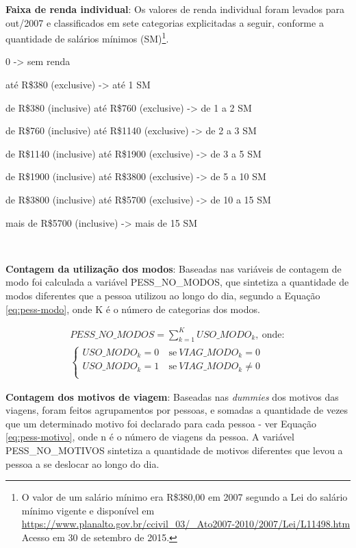 \begin{compactitem}
\item \textbf{Faixa de renda individual}: Os valores de renda individual foram levados para out/2007 e classificados em sete categorias explicitadas a seguir, conforme a quantidade de salários mínimos (SM)\footnote{O valor de um salário mínimo era R\$380,00 em 2007 segundo a Lei do salário mínimo vigente e disponível em \url{ https://www.planalto.gov.br/ccivil_03/_Ato2007-2010/2007/Lei/L11498.htm} Acesso em 30 de setembro de 2015.}.
    \begin{compactitem}[]
    \item 0 -> sem renda
    \item até R\$380 (exclusive) -> até 1 SM
    \item de R\$380 (inclusive) até R\$760 (exclusive) -> de 1 a 2 SM
    \item de R\$760 (inclusive) até R\$1140 (exclusive) -> de 2 a 3 SM
    \item de R\$1140 (inclusive) até R\$1900 (exclusive) -> de 3 a 5 SM
    \item de R\$1900 (inclusive) até R\$3800 (exclusive) -> de 5 a 10 SM
    \item de R\$3800 (inclusive) até R\$5700 (exclusive) -> de 10 a 15 SM 
    \item mais de R\$5700 (inclusive) -> mais de 15 SM        
    \end{compactitem}\

\newpage
\item \textbf{Contagem da utilização dos modos}: Baseadas nas variáveis de contagem de modo foi calculada a variável PESS_NO_MODOS, que sintetiza a quantidade de modos diferentes que a pessoa utilizou ao longo do dia, segundo a Equação \eqref{eq:pess-modo}, onde K é o número de categorias dos modos.

\begin{equation}\label{eq:pess-modo}
\begin{split}
PESS\_NO\_MODOS=\displaystyle\sum_{k=1}^{K}USO\_MODO_{k},\ \text{onde}:\\
\begin{cases}
        USO\_MODO_{k}=0 & \ \text{se}\  VIAG\_MODO_{k}=0\\
        USO\_MODO_{k}=1 & \ \text{se}\  VIAG\_MODO_{k} \neq 0\\
\end{cases}
\end{split}
\end{equation}

\item \textbf{Contagem dos motivos de viagem}: Baseadas nas \textit{dummies} dos motivos das viagens, foram feitos agrupamentos por pessoas, e somadas a quantidade de vezes que um determinado motivo foi declarado para cada pessoa - ver Equação \eqref{eq:pess-motivo}, onde n é o número de viagens da pessoa.
A variável PESS_NO_MOTIVOS sintetiza a quantidade de motivos diferentes que levou a pessoa a se deslocar ao longo do dia.


\end{compactitem}
